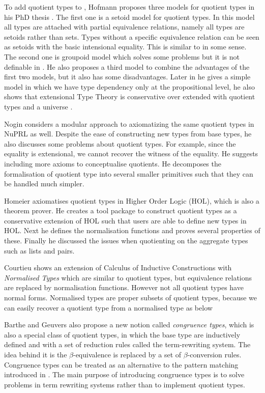 To add quotient types to \mltt{}, Hofmann proposes  three models for
quotient types in his PhD thesis \cite{hof:phd}. The first one is a setoid model for
quotient types. In this model all types are attached with partial
equivalence relations, namely all types are setoids rather than
sets. Types without a specific equivalence relation can be seen as
setoids with the basic intensional equality. This is similar to
\ett{} in some sense. The second one is groupoid model which solves some problems
but it is not definable in \itt{}. He also proposes a third model to
combine the advantages of the first two models, but it also has some
disadvantages. Later in \cite{hof:95:sm} he gives a simple model in which we have type dependency only at the propositional level, he also shows that extensional Type Theory is conservative over \itt  extended with quotient types and a universe \cite{hof:95:con}.

Nogin \cite{nog:02} considers a modular approach to axiomatizing the
same quotient types in NuPRL as well. Despite the ease of constructing new types
from base types, he also discusses some
problems about quotient types. For example, since the equality is
extensional, we cannot recover the
witness of the equality.  He suggests including more axioms to
conceptualise quotients. He decomposes the formalisation of quotient type
into several smaller primitives such that they can be handled much
simpler.

Homeier \cite{hom} axiomatises quotient types in Higher Order Logic
(HOL), which is also a theorem prover. He creates a tool package to
construct quotient types as a conservative extension of HOL such that
users are able to define new types in HOL. Next he defines the
normalisation functions and proves several properties of
these. Finally he discussed the issues when quotienting on the
aggregate types such as lists and pairs.


Courtieu \cite{cou:01} shows an extension of Calculus of Inductive Constructions
with \emph{Normalised Types} which are similar to quotient types, but equivalence relations are replaced by normalisation functions. 
However not all quotient types have normal forms. Normalised types are
proper subsets of quotient types, because we can easily recover a quotient
type from a normalised type as below


Barthe and Geuvers \cite{bar:96} also propose a new notion called
\emph{congruence types}, which is also a special class of quotient
types, in which the base type are inductively defined and with a set
of reduction rules called the term-rewriting system. The idea behind
it is the $\beta$-equivalence is replaced by a set of
$\beta$-conversion rules. Congruence types can be treated as an
alternative to the pattern matching introduced in \cite{coq:92}. The main
purpose of introducing congruence types is to solve problems in
term rewriting systems rather than to implement quotient types.


